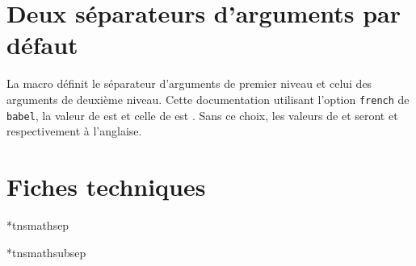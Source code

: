 \documentclass[12pt,a4paper]{article}
\begin{document}
\section{Deux séparateurs d'arguments par défaut}

La macro  définit le séparateur d'arguments de premier niveau et  celui des arguments de deuxième niveau.
Cette documentation utilisant l'option \verb+french+ de \verb+babel+, la valeur de 
 est \fbox{\,\tnsmathsep$\vphantom{F}$\,} 
et celle de
 est \fbox{\,\tnsmathsubsep$\vphantom{F}$\,} .
Sans ce choix, les valeurs de  et  seront \fbox{\,\tnsmathsubsep$\vphantom{F}$\,} et \fbox{\,\tnsmathsep$\vphantom{F}$\,} respectivement à l'anglaise.


\section{Fiches techniques}

\IDmacro**{tnsmathsep}

\IDmacro**{tnsmathsubsep}
\end{document}
